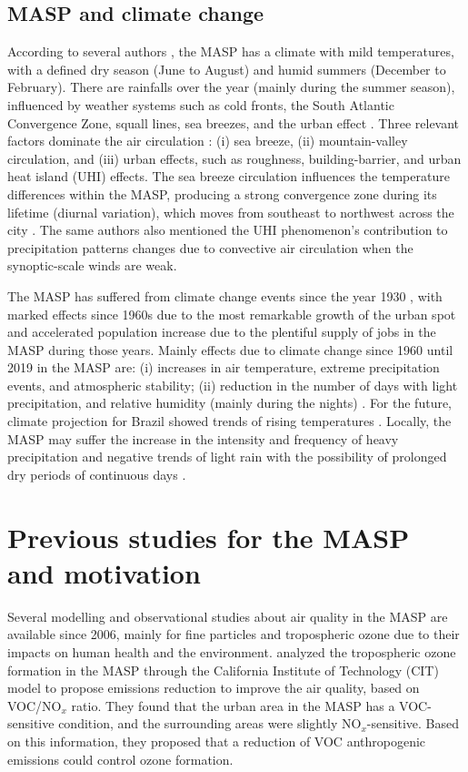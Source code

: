\subsection{MASP and climate change}
According to several authors \citep{Andrade2017, Lima2018}, the MASP has a climate with mild temperatures, with a defined dry season (June to August) and humid summers (December to February).
There are rainfalls over the year (mainly during the summer season), influenced by weather systems such as cold fronts, the South Atlantic Convergence Zone, squall lines, sea breezes, and the urban effect \citep{Andrade2017, Lima2018}.
Three relevant factors dominate the air circulation \citep{Oliveira2003}: (i) sea breeze, (ii) mountain-valley circulation, and (iii) urban effects, such as roughness, building-barrier, and urban heat island (UHI) effects.
The sea breeze circulation influences the temperature differences within the MASP, producing a strong convergence zone during its lifetime (diurnal variation), which moves from southeast to northwest across the city \citep{Lima2018}.
The same authors also mentioned the UHI phenomenon's contribution to precipitation patterns changes due to convective air circulation when the synoptic-scale winds are weak.

The MASP has suffered from climate change events since the year 1930 \citep{Marengo2020}, with marked effects since 1960s \citep{Lima2018} due to the most remarkable growth of the urban spot and accelerated population increase due to the plentiful supply of jobs in the MASP during those years.
Mainly effects due to climate change since 1960 until 2019 in the MASP are: (i) increases in air temperature, extreme precipitation events, and atmospheric stability; (ii) reduction in the number of days with light precipitation, and relative humidity (mainly during the nights) \citep{Marengo2013, Lima2018, Nobre2019, Marengo2020}.
For the future, climate projection for Brazil showed trends of rising temperatures \citep{Nobre2019}.
Locally, the MASP may suffer the increase in the intensity and frequency of heavy precipitation and negative trends of light rain with the possibility of prolonged dry periods of continuous days \citep{Marengo2013}. 

\section{Previous studies for the MASP and motivation}\label{sec: prev studies}
Several modelling and observational studies about air quality in the MASP are available since 2006, mainly for fine particles and tropospheric ozone due to their impacts on human health and the environment.
\citet*{Sanchez-Ccoyllo2006} analyzed the tropospheric ozone formation in the MASP through the California Institute of Technology (CIT) model to propose emissions reduction to improve the air quality, based on VOC/NO$_x$ ratio.
They found that the urban area in the MASP has a VOC-sensitive condition, and the surrounding areas were slightly NO$_x$-sensitive.
Based on this information, they proposed that a reduction of VOC anthropogenic emissions could control ozone formation.


